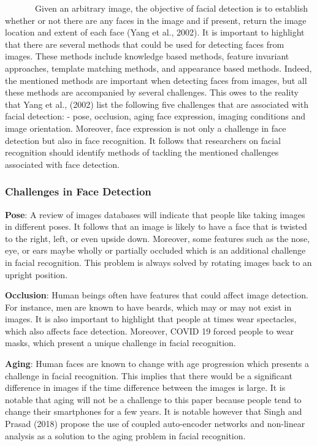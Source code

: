\documentclass[
  12pt,
]{report}
\begin{document}
~~~~~~~Given an arbitrary image, the objective of facial detection is to
establish whether or not there are any faces in the image and if
present, return the image location and extent of each face (Yang et al.,
2002). It is important to highlight that there are several methods that
could be used for detecting faces from images. These methods include
knowledge based methods, feature invariant approaches, template matching
methods, and appearance based methods. Indeed, the mentioned methods are
important when detecting faces from images, but all these methods are
accompanied by several challenges. This owes to the reality that Yang et
al., (2002) list the following five challenges that are associated with
facial detection: - pose, occlusion, aging face expression, imaging
conditions and image orientation. Moreover, face expression is not only
a challenge in face detection but also in face recognition. It follows
that researchers on facial recognition should identify methods of
tackling the mentioned challenges associated with face detection.

\subsubsection{\texorpdfstring{Challenges in Face Detection\\
}{Challenges in Face Detection }}\label{challenges-in-face-detection}

\textbf{Pose}: A review of images databases will indicate that people
like taking images in different poses. It follows that an image is
likely to have a face that is twisted to the right, left, or even upside
down. Moreover, some features such as the nose, eye, or ears maybe
wholly or partially occluded which is an additional challenge in facial
recognition. This problem is always solved by rotating images back to an
upright position.

\textbf{Occlusion}: Human beings often have features that could affect
image detection. For instance, men are known to have beards, which may
or may not exist in images. It is also important to highlight that
people at times wear spectacles, which also affects face detection.
Moreover, COVID 19 forced people to wear masks, which present a unique
challenge in facial recognition.

\textbf{Aging}: Human faces are known to change with age progression
which presents a challenge in facial recognition. This implies that
there would be a significant difference in images if the time difference
between the images is large. It is notable that aging will not be a
challenge to this paper because people tend to change their smartphones
for a few years. It is notable however that Singh and Prasad (2018)
propose the use of coupled auto-encoder networks and non-linear analysis
as a solution to the aging problem in facial recognition.
\end{document}
